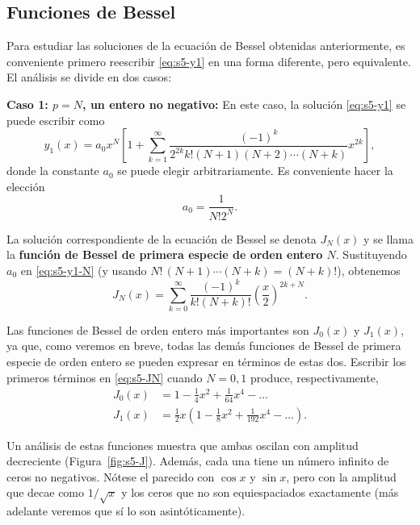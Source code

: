\subsection{Funciones de Bessel}
 
Para estudiar las soluciones de la ecuación de Bessel obtenidas anteriormente, es conveniente primero reescribir \eqref{eq:s5-y1} en una forma diferente, pero equivalente. El análisis se divide en dos casos:
 
\vspace{0.3cm}
\noindent \textbf{Caso 1: $p = N$, un entero no negativo:} \quad En este caso, la solución \eqref{eq:s5-y1} se puede escribir como
\begin{equation}
y_1(x) = a_0 x^N \left[ 1 + \sum_{k=1}^{\infty} \frac{(-1)^k}{2^{2k}k!(N + 1)(N + 2) \cdots (N + k)}x^{2k} \right],
\label{eq:s5-y1-N}
\end{equation}
donde la constante $a_0$ se puede elegir arbitrariamente. Es conveniente hacer la elección
\[ a_0 = \frac{1}{N!2^N}. \]
 
\begin{definition}
La solución correspondiente de la ecuación de Bessel se denota $J_N(x)$ y se llama la \textbf{función de Bessel de primera especie de orden entero $N$}. Sustituyendo $a_0$ en \eqref{eq:s5-y1-N} (y usando $N!\,(N+1)\cdots(N+k)=(N+k)!$), obtenemos
\begin{equation}
J_N(x) = \sum_{k=0}^{\infty} \frac{(-1)^k}{k!(N + k)!} \left(\frac{x}{2}\right)^{2k+N}.
\label{eq:s5-JN}
\end{equation}
\end{definition}
 
\begin{remark}
    Las funciones de Bessel de orden entero más importantes son $J_0(x)$ y $J_1(x)$, ya que, como veremos en breve, todas las demás funciones de Bessel de primera especie de orden entero se pueden expresar en términos de estas dos. Escribir los primeros términos en \eqref{eq:s5-JN} cuando $N = 0, 1$ produce, respectivamente,
\begin{align*}
J_0(x) &= 1 - \frac{1}{4}x^2 + \frac{1}{64}x^4 - \dots \\
J_1(x) &= \frac{1}{2}x \left( 1 - \frac{1}{8}x^2 + \frac{1}{192}x^4 - \dots \right).
\end{align*}
\end{remark}
 
Un análisis de estas funciones muestra que ambas oscilan con amplitud decreciente (Figura~\ref{fig:s5-J}). Además, cada una tiene un número infinito de ceros no negativos. Nótese el parecido con $\cos x$ y $\sin x$, pero con la amplitud que decae como $1/\sqrt x$ y los ceros que no son equiespaciados exactamente (más adelante veremos que sí lo son asintóticamente).
 
